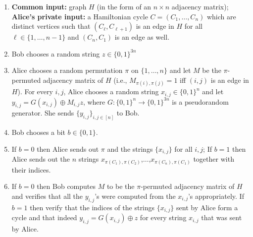 \begin{enumerate}
\def\labelenumi{\arabic{enumi}.}
\setcounter{enumi}{-1}
\item
  \textbf{Common input:} graph \(H\) (in the form of an \(n\times n\)
  adjacency matrix); \textbf{Alice's private input:} a Hamiltonian cycle
  \(C=(C_1,\ldots,C_n)\) which are distinct vertices such that
  \((C_\ell,C_{\ell+1})\) is an edge in \(H\) for all
  \(\ell\in\{1,\ldots,n-1\}\) and \((C_n,C_1)\) is an edge as well.
\item
  Bob chooses a random string \(z\in \{0,1\}^{3n}\)
\item
  Alice chooses a random permutation \(\pi\) on \(\{1,\ldots, n\}\) and
  let \(M\) be the \(\pi\)-permuted adjacency matrix of \(H\) (i.e.,
  \(M_{\pi(i),\pi(j)}=1\) iff \((i,j)\) is an edge in \(H\)). For every
  \(i,j\), Alice chooses a random string \(x_{i,j} \in \{0,1\}^n\) and
  let \(y_{i,j}=G(x_{i,j})\oplus M_{i,j}z\), where
  \(G:\{0,1\}^n\rightarrow\{0,1\}^{3n}\) is a pseudorandom generator.
  She sends \(\{ y_{i,j} \}_{i,j \in [n]}\) to Bob.
\item
  Bob chooses a bit \(b\in\{0,1\}\).
\item
  If \(b=0\) then Alice sends out \(\pi\) and the strings
  \(\{ x_{i,j} \}\) for all \(i,j\); If \(b=1\) then Alice sends out the
  \(n\) strings
  \(x_{\pi(C_1),\pi(C_2)}\),\(\ldots\),\(x_{\pi(C_n),\pi(C_1)}\)
  together with their indices.
\item
  If \(b=0\) then Bob computes \(M\) to be the \(\pi\)-permuted
  adjacency matrix of \(H\) and verifies that all the \(y_{i,j}\)'s were
  computed from the \(x_{i,j}\)'s appropriately. If \(b=1\) then verify
  that the indices of the strings \(\{ x_{i,j } \}\) sent by Alice form
  a cycle and that indeed \(y_{i,j}=G(x_{i,j})\oplus z\) for every
  string \(x_{i,j}\) that was sent by Alice.
\end{enumerate}

\hypertarget{zkhamthm}{}

